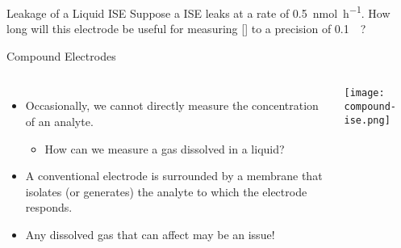 \documentclass[notes=show]{beamer}
\begin{document}

\begin{frame}[t]{Leakage of a Liquid ISE}
	Suppose a  ISE leaks at a rate of
	\SI{0.5}{\nano\mole\per\hour}. How long will this electrode be useful
	for measuring [] to a precision of \SI{0.1}{\micro\Molar}?

	\note{}
\end{frame}

\clearpage

\begin{frame}{Compound Electrodes}
	\begin{columns}
		\begin{itemize}
			\item Occasionally, we cannot directly measure the
				concentration of an analyte.
				\begin{itemize}
					\item How can we measure a gas dissolved
						in a liquid?
				\end{itemize}
			\item  A conventional electrode is surrounded by a
				membrane that isolates (or generates) the
				analyte to which the electrode responds.
			\item Any dissolved gas that can affect \pH{} may be an
				issue!
		\end{itemize}
		\begin{center}
			\texttt{[image: compound-ise.png]}
		\end{center}
	\end{columns}
\end{frame}

\end{document}

